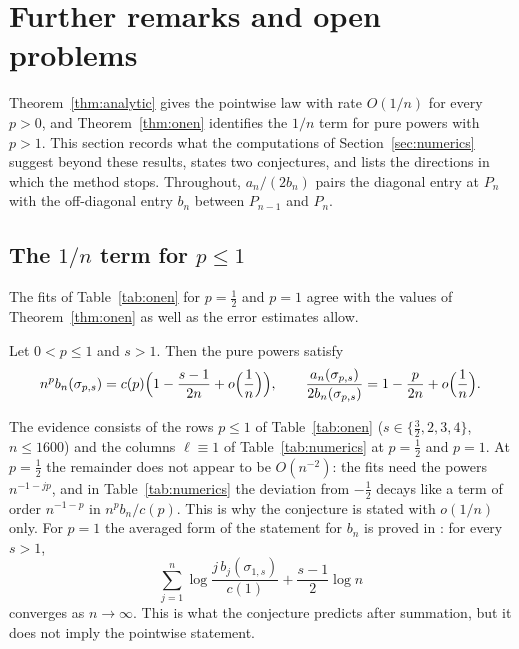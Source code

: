
\section{Further remarks and open problems}\label{sec:further}

Theorem~\ref{thm:analytic} gives the pointwise law with rate $O(1/n)$ for every $p>0$, and Theorem~\ref{thm:onen}
identifies the $1/n$ term for pure powers with $p>1$. This section records what the computations of
Section~\ref{sec:numerics} suggest beyond these results, states two conjectures, and lists the directions in which the
method stops. Throughout, $a_n/(2b_n)$ pairs the diagonal entry at $P_n$ with the off-diagonal entry $b_n$ between
$P_{n-1}$ and $P_n$.

\subsection{\texorpdfstring{The $1/n$ term for $p\le1$}{The 1/n term for p <= 1}}\label{sec:onen-open}
The fits of Table~\ref{tab:onen} for $p=\frac12$ and $p=1$ agree with the values of Theorem~\ref{thm:onen} as well as
the error estimates allow.

\begin{conjecture}\label{conj:onen}
Let $0<p\le1$ and $s>1$. Then the pure powers satisfy
\[
  n^pb_n(\sigma_{p,s})=c(p)\Bigl(1-\frac{s-1}{2n}+o\Bigl(\frac1n\Bigr)\Bigr),\qquad
  \frac{a_n(\sigma_{p,s})}{2b_n(\sigma_{p,s})}=1-\frac{p}{2n}+o\Bigl(\frac1n\Bigr).
\]
\end{conjecture}

The evidence consists of the rows $p\le1$ of Table~\ref{tab:onen} ($s\in\{\frac32,2,3,4\}$, $n\le1600$) and the
columns $\ell\equiv1$ of Table~\ref{tab:numerics} at $p=\frac12$ and $p=1$. At $p=\frac12$ the remainder does not
appear to be $O(n^{-2})$: the fits need the powers $n^{-1-jp}$, and in Table~\ref{tab:numerics} the deviation from
$-\frac12$ decays like a term of order $n^{-1-p}$ in $n^pb_n/c(p)$. This is why the conjecture is stated with $o(1/n)$
only. For $p=1$ the averaged form of the statement for $b_n$ is proved in \cite{Paper3}: for every $s>1$,
\[
  \sum_{j=1}^n\log\frac{j\,b_j(\sigma_{1,s})}{c(1)}+\frac{s-1}2\log n
\]
converges as $n\to\infty$. This is what the conjecture predicts after summation, but it does not imply the pointwise
statement.

